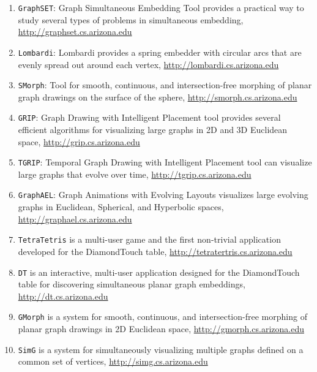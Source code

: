 \documentclass[10pt]{article}
\begin{document}
\begin{description}
\begin{enumerate}

\item {\tt GraphSET}: Graph Simultaneous Embedding Tool provides a practical way to study several types of problems in simultaneous embedding, \url{http://graphset.cs.arizona.edu}

\item {\tt Lombardi}: Lombardi provides a spring embedder with
  circular arcs that are evenly spread out around each vertex, \url{http://lombardi.cs.arizona.edu}

\item {\tt SMorph}: Tool for smooth, continuous, and intersection-free morphing of planar graph drawings on the surface of the sphere, \url{http://smorph.cs.arizona.edu}

\item {\tt GRIP}:  Graph Drawing with Intelligent Placement tool provides several efficient algorithms for visualizing large graphs in 2D and 3D Euclidean space, \url{http://grip.cs.arizona.edu}

\item {\tt TGRIP}: Temporal Graph Drawing with Intelligent Placement tool can visualize large graphs that evolve over time, \url{http://tgrip.cs.arizona.edu}

\item {\tt GraphAEL}: Graph Animations with Evolving Layouts visualizes large evolving graphs in Euclidean, Spherical, and Hyperbolic spaces, \url{http://graphael.cs.arizona.edu}

\item {\tt TetraTetris} is a multi-user game and the first non-trivial application developed for the DiamondTouch table, \url{http://tetratertris.cs.arizona.edu}

\item {\tt DT} is an interactive, multi-user application designed for the DiamondTouch table for discovering simultaneous planar graph embeddings, \url{http://dt.cs.arizona.edu}

\item {\tt GMorph} is a system for smooth, continuous, and intersection-free morphing of planar graph drawings in 2D Euclidean space, \url{http://gmorph.cs.arizona.edu}

\item {\tt SimG} is a system for simultaneously visualizing multiple graphs defined on a common set of vertices, \url{http://simg.cs.arizona.edu}


\end{enumerate}
\end{description}
\end{document}
